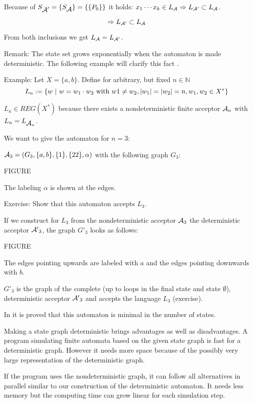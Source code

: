 Because of $S_{\mbox{$\mathcal{A'}$}} = \{ S_{\mbox{$\mathcal{A}$}} \} = \{\{ P_0 \}\}$ it holds: $x_1
\cdots x_k \in \mbox{$L_{\mathcal{A}}$} \Rightarrow \mbox{$L_{\mathcal{A'}}$} \subset \mbox{$L_{\mathcal{A}}$}$.

\[ \Rightarrow \mbox{$L_{\mathcal{A'}}$} \subset \mbox{$L_{\mathcal{A}}$}\]

From both inclusions we get $\mbox{$L_{\mathcal{A}}$} = \mbox{$L_{\mathcal{A'}}$}$.

Remark: The state set grows exponentially when the automaton is made
deterministic. The following example will clarify this fact \cite{Co}.

Example: Let $X = \{ a, b \}$. Define for arbitrary, but fixed $n \in
\mathbb{N}$ \[ L_n := \{ w \ |\  w = w_1 \cdot w_2 \mbox{ with } w1 \neq w_2, |w_1| = |w_2|
= n, w_1, w_2 \in X^* \} \]

$L_n \in REG(X^*)$ because there exists a nondeterministic finite acceptor
$\mbox{$\mathcal{A}$}_{n}$ with $L_n = L_{\mbox{$\mathcal{A}$}_{n}}$.

We want to give the automaton for $n = 3$:

$\mbox{$\mathcal{A}$}_3 = (G_3, \{a,b\}, \{1\}, \{22\}, \alpha)$ with the following graph
$G_3$:

FIGURE

The labeling $\alpha$ is shown at the edges.

Exercise: Show that this automaton accepts $L_3$.

If we construct for $L_3$ from the nondeterministic acceptor $\mbox{$\mathcal{A}$}_3$
the deterministic acceptor $\mbox{$\mathcal{A'}$}_3$, the graph $G'_3$ looks as follows:

FIGURE

The edges pointing upwards are labeled with $a$ and the edges pointing downwards
with $b$.

$G'_3$ is the graph of the complete (up to loops in the final state and state
$\emptyset$), deterministic acceptor $\mbox{$\mathcal{A'}$}_3$ and accepts the language $L_3$
(exercise).

In \cite{Co} it is proved that this automaton is minimal in the number of
states.

Making a state graph deterministic brings advantages as well as disadvantages. A
program simulating finite automata based on the given state graph is fast for
a deterministic graph. However it needs more space because of the possibly very
large representation of the deterministic graph.

If the program uses the nondeterministic graph, it can follow all alternatives
in parallel similar to our construction of the deterministic automaton. It needs
less memory but the computing time can grow linear for each simulation step.

